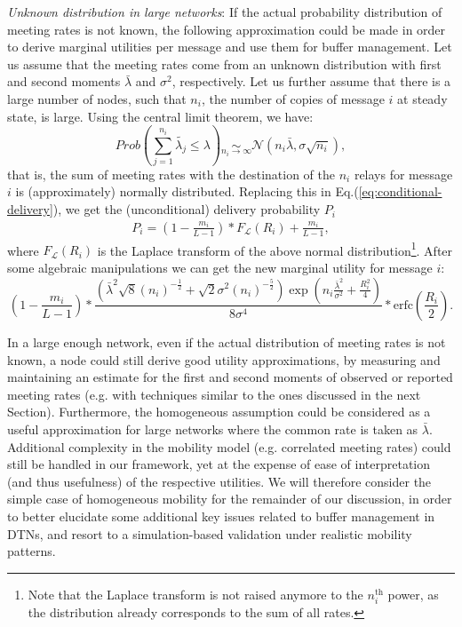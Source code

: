 \emph{Unknown distribution in large networks}: If the actual probability distribution of meeting rates is not known, the following approximation could be made in order to derive marginal utilities per message and use them for buffer management. Let us assume that the meeting rates come from an unknown distribution with first and second moments $\bar{\lambda}$ and $\sigma^{2}$, respectively. Let us further assume that there is a large number of nodes, such that $n_{i}$, the number of copies of message $i$ at steady state, is large. Using the central limit theorem, we have:
\begin{equation}
Prob(\sum_{j=1}^{n_{i}} \tilde{\lambda_{j}} \le \lambda) \underset{n_{i} \rightarrow \infty}{\sim} \mathcal{N}(n_{i}\bar{\lambda}, \sigma \sqrt{n_{i}}),
\end{equation}
that is, the sum of meeting rates with the destination of the $n_{i}$ relays for message $i$ is (approximately) normally distributed. Replacing this in Eq.(\ref{eq:conditional-delivery}), we get the (unconditional) delivery probability $P_{i}$
\begin{eqnarray*}
P_{i} = (1 - \frac{m_i}{L-1})* F_{\mathcal{L}}(R_{i}) + \frac{m_i}{L-1},
\end{eqnarray*}
where $F_{\mathcal{L}}(R_{i})$ is the Laplace transform of the above normal distribution\footnote{Note that the Laplace transform is not raised anymore to the $n_{i}^{\mbox{th}}$ power, as the distribution already corresponds to the sum of all rates.}. After some algebraic manipulations we can get the new marginal utility for message $i$:
\footnotesize
\begin{equation}
(1 - \frac{m_i}{L-1}) * \frac{ (\bar{\lambda}^{2} \sqrt{8} (n_{i})^{-\frac{1}{2}} + \sqrt{2} \sigma^{2} (n_{i})^{-\frac{5}{2}}) \exp( n_{i} \frac{\bar{\lambda}^{2}}{\sigma^{2}} + \frac{R_{i}^{2}}{4} )}{8 \sigma^{4}} * \mbox{erfc}(\frac{R_{i}}{2}).
\end{equation}
\normalsize

In a large enough network, even if the actual distribution of meeting rates is not known, a node could still derive good utility approximations, by measuring and maintaining an estimate for the first and second moments of observed or reported meeting rates (e.g. with techniques similar to the ones discussed in the next Section). Furthermore, the homogeneous assumption could be considered as a useful approximation for large networks where the common rate is taken as $\bar{\lambda}$. Additional complexity in the mobility model (e.g. correlated meeting rates) could still be handled in our framework, yet at the expense of ease of interpretation (and thus usefulness) of the respective utilities. We will therefore consider the simple case of homogeneous mobility for the remainder of our discussion, in order to better elucidate some additional key issues related to buffer management in DTNs, and resort to a simulation-based validation under realistic mobility patterns.

